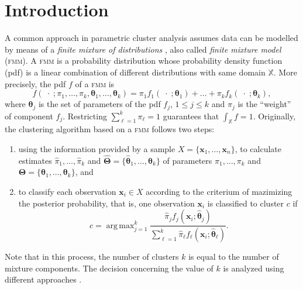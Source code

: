 \documentclass[submit]{smj}
\DeclareMathOperator*{\argmax}{arg\,max}
\theoremstyle{definition}
\newcommand{\m}[1]{\boldsymbol{#1}}
\newcommand{\fmm}{\textsc{fmm}\xspace}
\begin{document}



\maketitle

\section{Introduction}


A common approach in parametric cluster analysis assumes data can be modelled by means of a \emph{finite mixture of distributions} \citep{fraley2002model}, also called \emph{finite mixture model} (\fmm). A \fmm is a probability distribution whose probability density function (pdf) is a linear combination of different distributions with same domain $\mathbb{X}$. More precisely, the pdf $f$ of a \fmm is
\begin{equation}\label{mixt}
f(\;\cdot\; ; \pi_1, \dots, \pi_k, \m\theta_1, \dots, \m\theta_k) = \pi_1 f_1(\;\cdot\; ; \m\theta_1) + \dots + \pi_k f_k(\;\cdot\; ; \m\theta_k),
\end{equation}
where $\m\theta_j$ is the set of parameters of the pdf $f_j$, $1\leq j \leq k$ and $\pi_j$ is the ``weight'' of component $f_j$. Restricting $\sum_{\ell = 1}^k \pi_\ell = 1$ guarantees that  $\int_{\mathbb{X}}f = 1$. Originally, the clustering algorithm based on a \fmm follows two steps:
\begin{enumerate}
\item using the information provided by a sample $X=\{\m x_1, \dots, \m x_n\}$, to calculate estimates $\hat{\pi}_1, \dots, \hat{\pi}_k$ and $\hat{\m\Theta}=\{\hat{\m\theta}_1, \dots, \hat{\m\theta}_k\}$ of parameters $\pi_1, \dots, \pi_k$ and $\m\Theta=\{\m\theta_1, \dots, \m\theta_k\}$, and
\item to classify each observation $\m x_i \in X$ according to the criterium of mazimizing the posterior probability, that is, one observation $\m x_i$ is classified to cluster $c$ if
\begin{equation}\label{map_criteria}
c=\argmax_{j=1}^k \frac{ \hat{\pi}_j f_j(\m x_i ; \hat{\m\theta}_j) }{\sum_{\ell=1}^k \hat{\pi}_\ell f_\ell(\m x_i ; \hat{\m\theta}_\ell) }.
\end{equation}
\end{enumerate}
Note that in this process, the number of clusters $k$ is equal to the number of mixture components. The decision concerning the value of $k$ is analyzed using different approaches \citep{mclachlan2014components}.
\end{document}

